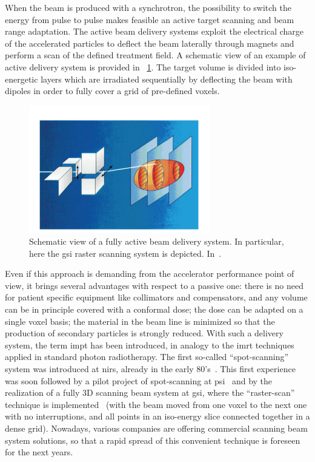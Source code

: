 When the beam is produced with a synchrotron,  the possibility to switch the energy from pulse to pulse makes feasible an active target scanning and beam range adaptation. The active beam delivery systems exploit the electrical charge of the accelerated particles to deflect the beam laterally through magnets and perform a scan of the defined treatment field. A schematic view of an example of active delivery system is provided in \figurename~\ref{chap1::fig::activeDelivery}. The target volume is divided into iso-energetic layers which are irradiated sequentially by deflecting the beam with dipoles in order to fully cover a grid of pre-defined voxels.              

\begin{figure}[!htbp]
\centering
\includegraphics[width=0.7\textwidth]{03_GraphicFiles/chapter1_Introduction/activeDelivery.pdf}
\caption{Schematic view of a fully active beam delivery system. In particular, here the \gls{gsi} raster scanning system is depicted. In~\cite{Schulz-Ertner2006}.}
\label{chap1::fig::activeDelivery}
\end{figure} 

Even if this approach is demanding from the accelerator performance point of view, it brings several advantages with respect to a passive one: there is no need for patient specific equipment like collimators and compensators, and any volume can be in principle covered with a conformal dose; the dose can be adapted on a single voxel basis; the material in the beam line is minimized so that the production of secondary particles is strongly reduced. 
With such a delivery system, the term \gls{impt} has been introduced, in analogy to the \gls{imrt} techniques applied in standard photon radiotherapy.
The first so-called \enquote{spot-scanning} system was introduced at \gls{nirs}, already in the early 80's~\parencite{Kanai1983}. This first experience was soon followed by a pilot project of spot-scanning at \gls{psi}~\parencite{Pedroni1995} and by the realization of a fully 3D scanning beam system at \gls{gsi}, where the \enquote{raster-scan} technique is implemented~\parencite{Haberer1993} (with the beam moved from one voxel to the next one with no interruptions, and all points in an iso-energy slice connected together in a dense grid).
Nowadays, various companies are offering commercial scanning beam system solutions, so that a rapid spread of this convenient technique is foreseen for the next years.
 
